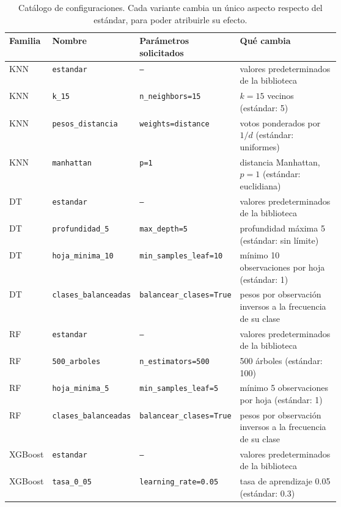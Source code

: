 \documentclass[11pt]{article}
\begin{document}
\begin{table}[H]\centering\footnotesize
\caption{Catálogo de configuraciones. Cada variante cambia un único aspecto respecto del estándar, para poder atribuirle su efecto.}
\label{tab:catalogo}
\begin{tabular}{llp{0.27\linewidth}p{0.36\linewidth}}\toprule
Familia & Nombre & Parámetros solicitados & Qué cambia \\ \midrule
KNN & \texttt{estandar} & \texttt{--} & valores predeterminados de la biblioteca \\
KNN & \texttt{k\_\allowbreak{}15} & \texttt{n\_\allowbreak{}neighbors=15} & $k=15$ vecinos (estándar: 5) \\
KNN & \texttt{pesos\_\allowbreak{}distancia} & \texttt{weights=distance} & votos ponderados por $1/d$ (estándar: uniformes) \\
KNN & \texttt{manhattan} & \texttt{p=1} & distancia Manhattan, $p=1$ (estándar: euclidiana) \\
DT & \texttt{estandar} & \texttt{--} & valores predeterminados de la biblioteca \\
DT & \texttt{profundidad\_\allowbreak{}5} & \texttt{max\_\allowbreak{}depth=5} & profundidad máxima 5 (estándar: sin límite) \\
DT & \texttt{hoja\_\allowbreak{}minima\_\allowbreak{}10} & \texttt{min\_\allowbreak{}samples\_\allowbreak{}leaf=10} & mínimo 10 observaciones por hoja (estándar: 1) \\
DT & \texttt{clases\_\allowbreak{}balanceadas} & \texttt{balancear\_\allowbreak{}clases=True} & pesos por observación inversos a la frecuencia de su clase \\
RF & \texttt{estandar} & \texttt{--} & valores predeterminados de la biblioteca \\
RF & \texttt{500\_\allowbreak{}arboles} & \texttt{n\_\allowbreak{}estimators=500} & 500 árboles (estándar: 100) \\
RF & \texttt{hoja\_\allowbreak{}minima\_\allowbreak{}5} & \texttt{min\_\allowbreak{}samples\_\allowbreak{}leaf=5} & mínimo 5 observaciones por hoja (estándar: 1) \\
RF & \texttt{clases\_\allowbreak{}balanceadas} & \texttt{balancear\_\allowbreak{}clases=True} & pesos por observación inversos a la frecuencia de su clase \\
XGBoost & \texttt{estandar} & \texttt{--} & valores predeterminados de la biblioteca \\
XGBoost & \texttt{tasa\_\allowbreak{}0\_\allowbreak{}05} & \texttt{learning\_\allowbreak{}rate=0.05} & tasa de aprendizaje 0.05 (estándar: 0.3) \\

\end{tabular}
\end{table}
\end{document}
